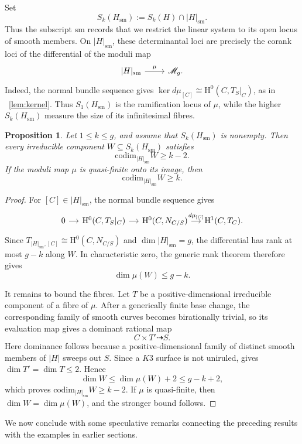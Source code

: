 \documentclass[a4paper,12pt,twoside,reqno]{amsart}
\makeatletter
\numberwithin{equation}{section}
\def\cr@pref#1:#2\@nil{#1}
\newcommand{\cr@tsing}[1]{\@nameuse{cr@map@\cr@pref#1:\@nil}}
\newcommand{\Cref}[1]{\cr@tsing{#1}~\ref{#1}}
\theoremstyle{plain}
\newtheorem{proposition}[theorem]{Proposition}
\theoremstyle{definition}
\newcommand{\sm}{\mathrm{sm}}
\newcommand{\Mmod}{\mathscr{M}}
\newcommand{\codim}{\mathrm{codim}}
\newcommand{\HH}{\mathrm{H}}
\theoremstyle{plain}
\theoremstyle{definition}
\makeatother
\begin{document}
Set
\[
S_k(H_{\sm}):=S_k(H)\cap |H|_{\sm}.
\]
Thus the subscript $\sm$ records that we restrict the linear system to its open locus of smooth members. On $|H|_{\sm}$, these determinantal loci are precisely the corank loci of the differential of the moduli map
\[
\begin{tikzcd}
{|H|_{\sm}} \arrow[r, "\mu"] & \Mmod_g.
\end{tikzcd}
\]
Indeed, the normal bundle sequence gives $\ker d\mu_{[C]}\cong\HH^0(C,T_S|_C)$, as in \Cref{lem:kernel}. Thus $S_1(H_{\sm})$ is the ramification locus of $\mu$, while the higher $S_k(H_{\sm})$ measure the size of its infinitesimal fibres.

\begin{proposition}\label{prop:jumping-codimension}
Let $1\le k\le g$, and assume that $S_k(H_{\sm})$ is nonempty. Then every irreducible component $W\subseteq S_k(H_{\sm})$ satisfies
\[
\codim_{|H|_{\sm}} W\ge k-2.
\]
If the moduli map $\mu$ is quasi-finite onto its image, then
\[
\codim_{|H|_{\sm}} W\ge k.
\]
\end{proposition}

\begin{proof}
For $[C]\in |H|_{\sm}$, the normal bundle sequence gives
\[
\begin{tikzcd}[column sep=small]
0 \arrow[r] & \HH^0(C,T_S|_C) \arrow[r]
& \HH^0(C,N_{C/S}) \arrow[r, "d\mu_{[C]}"]
& \HH^1(C,T_C).
\end{tikzcd}
\]
Since $T_{|H|_{\sm},[C]}\cong\HH^0(C,N_{C/S})$ and $\dim |H|_{\sm}=g$, the differential has rank at most $g-k$ along $W$. In characteristic zero, the generic rank theorem therefore gives
\[
\dim\mu(W)\le g-k.
\]

It remains to bound the fibres. Let $T$ be a positive-dimensional irreducible component of a fibre of $\mu$. After a generically finite base change, the corresponding family of smooth curves becomes birationally trivial, so its evaluation map gives a dominant rational map
\[
C\times T'\dashrightarrow S.
\]
Here dominance follows because a positive-dimensional family of distinct smooth members of $|H|$ sweeps out $S$. Since a $K3$ surface is not uniruled, \cite[Lemma~2.3]{CG} gives $\dim T'=\dim T\le2$. Hence
\[
\dim W\le\dim\mu(W)+2\le g-k+2,
\]
which proves $\codim_{|H|_{\sm}}W\ge k-2$. If $\mu$ is quasi-finite, then $\dim W=\dim\mu(W)$, and the stronger bound follows.
\end{proof}

We now conclude with some speculative remarks connecting the preceding results with the examples in earlier sections.
\end{document}
